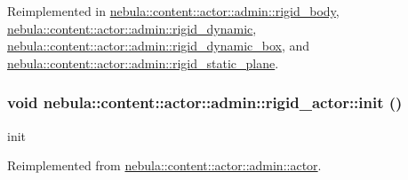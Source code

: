 Reimplemented in \hyperlink{classnebula_1_1content_1_1actor_1_1admin_1_1rigid__body_a649883f2e1d157c2b94cc475f458a3c4}{nebula::content::actor::admin::rigid\_\-body}, \hyperlink{classnebula_1_1content_1_1actor_1_1admin_1_1rigid__dynamic_a263f07931e9281ea4044c522b567dde1}{nebula::content::actor::admin::rigid\_\-dynamic}, \hyperlink{classnebula_1_1content_1_1actor_1_1admin_1_1rigid__dynamic__box_ad0aba702fbf1cb38fabc3b84f6a2ef93}{nebula::content::actor::admin::rigid\_\-dynamic\_\-box}, and \hyperlink{classnebula_1_1content_1_1actor_1_1admin_1_1rigid__static__plane_ad967d0a5cd7a1ee7864c28f6b73aff80}{nebula::content::actor::admin::rigid\_\-static\_\-plane}.\hypertarget{classnebula_1_1content_1_1actor_1_1admin_1_1rigid__actor_a4de1558a31bb13bcf92279a4d823ddbb}{
\subsubsection[{init}]{\setlength{\rightskip}{0pt plus 5cm}void nebula::content::actor::admin::rigid\_\-actor::init ()}}
\label{classnebula_1_1content_1_1actor_1_1admin_1_1rigid__actor_a4de1558a31bb13bcf92279a4d823ddbb}


init 

Reimplemented from \hyperlink{classnebula_1_1content_1_1actor_1_1admin_1_1actor_a36b8f2c3d8b0bab0a2a3540ec1bf693d}{nebula::content::actor::admin::actor}.

